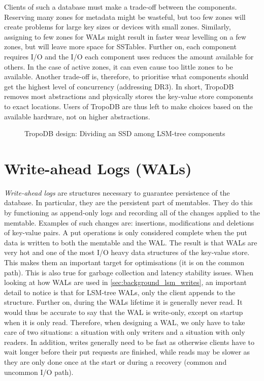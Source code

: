 Clients of such a database must make a trade-off between the components. Reserving many zones for metadata might be wasteful, but too few zones will create problems for large key sizes or devices with small zones. Similarly, assigning to few zones for WALs might result in faster wear levelling on a few zones, but will leave more space for SSTables. Further on, each component requires I/O and the I/O each component uses reduces the amount available for others. In the case of active zones, it can even cause too little zones to be available. Another trade-off is, therefore, to prioritise what components should get the highest level of concurrency (addressing DR3). In short, TropoDB removes most abstractions and physically stores the key-value store components to exact locations. Users of TropoDB are thus left to make choices based on the available hardware, not on higher abstractions. 

 \begin{figure}[h]
\centering
\begin{minipage}{0.85\textwidth}
  \centering
  
\end{minipage}%
\caption{ TropoDB design: Dividing an SSD among LSM-tree components }
\label{fig:tropodesign}
\end{figure}


\section{Write-ahead Logs (WALs)}
\textit{Write-ahead logs} are structures necessary to guarantee persistence of the database. In particular, they are the persistent part of memtables. They do this by functioning as append-only logs and recording all of the changes applied to the memtable. Examples of such changes are: insertions, modifications and deletions of key-value pairs. A put operations is only considered complete when the put data is written to both the memtable and the WAL. The result is that WALs are very hot and one of the most I/O heavy data structures of the key-value store. This makes them an important target for optimisations (it is on the common path). This is also true for garbage collection and latency stability issues. When looking at how WALs are used in \autoref{sec:background_lsm_writes}, an important detail to notice is that for LSM-tree WALs, only the client appends to the structure. Further on, during the WALs lifetime it is generally never read. It would thus be accurate to say that the WAL is write-only, except on startup when it is only read. Therefore, when designing a WAL, we only have to take care of two situations: a situation with only writers and a situation with only readers. In addition, writes generally need to be fast as otherwise clients have to wait longer before their put requests are finished, while reads may be slower as they are only done once at the start or during a recovery (common and uncommon I/O path). 

